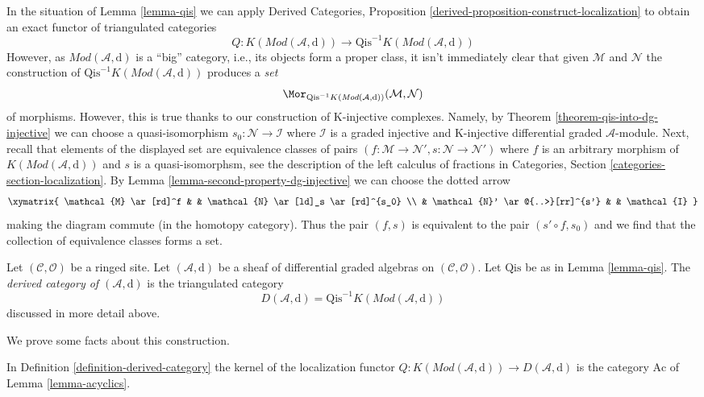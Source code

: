 \noindent
In the situation of Lemma \ref{lemma-qis} we can apply
Derived Categories, Proposition
\ref{derived-proposition-construct-localization}
to obtain an exact functor of triangulated categories
$$
Q :
K(\textit{Mod}(\mathcal{A}, \text{d}))
\longrightarrow
\text{Qis}^{-1}K(\textit{Mod}(\mathcal{A}, \text{d}))
$$
However, as $\textit{Mod}(\mathcal{A}, \text{d})$ is a ``big''
category, i.e., its objects form a proper class, it isn't immediately
clear that given $\mathcal{M}$ and $\mathcal{N}$ the construction
of $\text{Qis}^{-1}K(\textit{Mod}(\mathcal{A}, \text{d}))$
produces a {\it set}
$$
\Mor_{\text{Qis}^{-1}K(\textit{Mod}(\mathcal{A}, \text{d}))}
(\mathcal{M}, \mathcal{N})
$$
of morphisms. However, this is true thanks to our construction of
K-injective complexes. Namely, by Theorem \ref{theorem-qis-into-dg-injective}
we can choose a quasi-isomorphism $s_0 : \mathcal{N} \to \mathcal{I}$ where
$\mathcal{I}$ is a graded injective and K-injective
differential graded $\mathcal{A}$-module. Next, recall that elements of
the displayed set are equivalence classes of pairs
$(f : \mathcal{M} \to \mathcal{N}', s : \mathcal{N} \to \mathcal{N}')$
where $f$ is an arbitrary morphism of
$K(\textit{Mod}(\mathcal{A}, \text{d}))$ and $s$ is a quasi-isomorphsm, see
the description of the left calculus of fractions in
Categories, Section \ref{categories-section-localization}.
By Lemma \ref{lemma-second-property-dg-injective}
we can choose the dotted arrow
$$
\xymatrix{
\mathcal{M} \ar[rd]^f & &
\mathcal{N} \ar[ld]_s \ar[rd]^{s_0} \\
& \mathcal{N}' \ar@{..>}[rr]^{s'} & & \mathcal{I}
}
$$
making the diagram commute (in the homotopy category).
Thus the pair $(f, s)$ is equivalent to the pair $(s' \circ f, s_0)$
and we find that the collection of equivalence classes forms a set.

\begin{definition}
\label{definition-derived-category}
Let $(\mathcal{C}, \mathcal{O})$ be a ringed site. Let
$(\mathcal{A}, \text{d})$ be a sheaf of differential graded algebras
on $(\mathcal{C}, \mathcal{O})$. Let $\text{Qis}$ be as in
Lemma \ref{lemma-qis}. The
{\it derived category of $(\mathcal{A}, \text{d})$} is the triangulated
category
$$
D(\mathcal{A}, \text{d}) =
\text{Qis}^{-1}K(\textit{Mod}(\mathcal{A}, \text{d}))
$$
discussed in more detail above.
\end{definition}

\noindent
We prove some facts about this construction.

\begin{lemma}
\label{lemma-kernel-localization}
In Definition \ref{definition-derived-category}
the kernel of the localization functor
$Q : K(\textit{Mod}(\mathcal{A}, \text{d})) \to D(\mathcal{A}, \text{d})$
is the category $\text{Ac}$ of Lemma \ref{lemma-acyclics}.
\end{lemma}

